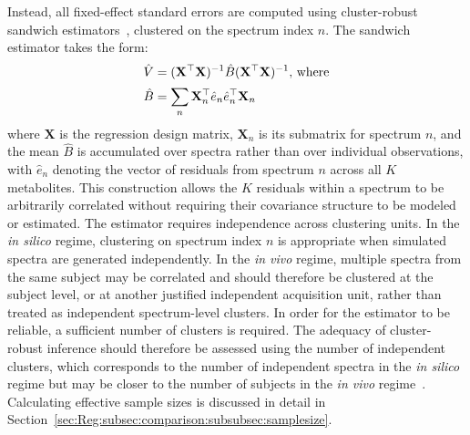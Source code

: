 Instead, all fixed-effect standard errors are computed using cluster-robust sandwich estimators~\cite{Liang1986,MacKinnon1985}, clustered on the spectrum index $n$. The sandwich estimator takes the form: 
\begin{subequations}\label{eqn:cluster robust}
\begin{align}
    \hat{V} &= (\mathbf{X}^\top \mathbf{X})^{-1} \hat{B} (\mathbf{X}^\top \mathbf{X})^{-1}\textnormal{, where}\label{eqn:sandwich estimator}\\[1pt]
    \hat{B} &= \sum_{n} \mathbf{X}_n^\top \hat{e}_n \hat{e}_n^\top \mathbf{X}_n\label{eqn:sandwich mean}
\end{align}
\end{subequations}%
\noindent where $\mathbf{X}$ is the regression design matrix, $\mathbf{X}_n$ is its submatrix for spectrum $n$, and the mean $\hat{B}$ is accumulated over spectra rather than over individual observations, with $\hat{e}_n$ denoting the vector of residuals from spectrum $n$ across all $K$ metabolites. This construction allows the $K$ residuals within a spectrum to be arbitrarily correlated without requiring their covariance structure to be modeled or estimated. The estimator requires independence across clustering units. In the \textit{in silico} regime, clustering on spectrum index $n$ is appropriate when simulated spectra are generated independently. In the \textit{in vivo} regime, multiple spectra from the same subject may be correlated and should therefore be clustered at the subject level, or at another justified independent acquisition unit, rather than treated as independent spectrum-level clusters. In order for the estimator to be reliable, a sufficient number of clusters is required. The adequacy of cluster-robust inference should therefore be assessed using the number of independent clusters, which corresponds to the number of independent spectra in the \textit{in silico} regime but may be closer to the number of subjects in the \textit{in vivo} regime~\cite{Cameron2008}. Calculating effective sample sizes is discussed in detail in Section~\ref{sec:Reg:subsec:comparison:subsubsec:samplesize}.

